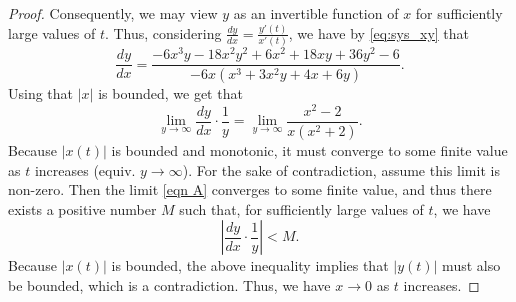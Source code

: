 \documentclass[10pt,a4paper]{amsart}
\begin{document}
\begin{proof}
        Consequently, we may view $y$ as an invertible function of $x$ for sufficiently large values of $t$.
        Thus, considering $\frac{dy}{dx} = \frac{y'(t)}{x'(t)}$, we have by \eqref{eq:sys_xy} that 
        \[ 
            \frac{dy}{dx} = \frac{-6x^3 y - 18x^2 y^2 + 6x^2 + 18x y + 36y^2 - 6}{-6x\left(x^3 + 3x^2 y + 4x + 6y\right)}. 
        \]
        Using that $|x|$ is bounded, we get that
        \begin{equation}\label{eqn A}
             \lim_{y \to \infty}\frac{dy}{dx} \cdot \frac{1}{y} = \lim_{y \to \infty}\frac{x^2-2}{x\left(x^2+2\right)}. 
        \end{equation}
        Because $|x(t)|$ is bounded and monotonic, it must converge to some finite value as $t$ increases (equiv. $y\to \infty$).
        For the sake of contradiction, assume this limit is non-zero.
        Then the limit \eqref{eqn A} converges to some finite value, and thus there exists a positive number $M$ such that, for sufficiently large values of $t$, we have
        \[
            \left | \frac{dy}{dx} \cdot \frac{1}{y} \right | < M.
        \]
        Because $|x(t)|$ is bounded, the above inequality implies that $|y(t)|$ must also be bounded, which is a contradiction.
        Thus, we have $x\to 0$ as $t$ increases.

\end{proof}
\end{document}
